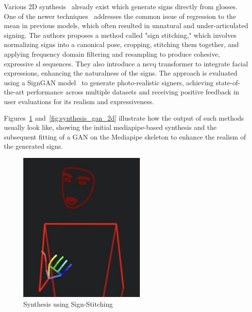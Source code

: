 \documentclass[../../main.tex]{subfiles}
\begin{document}
Various 2D synthesis~\cite{jiang2024signclipconnectingtextsign, moryossef2024signmtrealtimemultilingualsign} already exist which generate signs directly from \gls{glosses}. One of the newer techniques~\cite{walsh2024sign} addresses the common issue of regression to the mean in previous models, which often resulted in unnatural and under-articulated signing. The authors proposes a method called "sign stitching," which involves normalizing signs into a canonical pose, cropping, stitching them together, and applying frequency domain filtering and resampling to produce cohesive, expressive \gls{sl} sequences. They also introduce a \gls{nsvq} transformer to integrate facial expressions, enhancing the naturalness of the signs. The approach is evaluated using a SignGAN model~\cite{saunders2020everybodysignnowtranslating} to generate photo-realistic signers, achieving state-of-the-art performance across multiple datasets and receiving positive feedback in user evaluations for its realism and expressiveness.

Figures~\ref{fig:synthesis_mediaipe_2d} and~\ref{fig:synthesis_gan_2d} illustrate how the output of such methods usually look like, showing the initial mediapipe-based synthesis and the subsequent fitting of a GAN on the Mediapipe skeleton to enhance the realism of the generated signs.

\begin{figure}
  \centering \includegraphics[width = 2.5in]{chapters/background_work/images/sign_writing_synthesis.png} 
  \caption{Synthesis using Sign-Stitching} 
  \label{fig:synthesis_mediaipe_2d} 
\end{figure}
\end{document}
